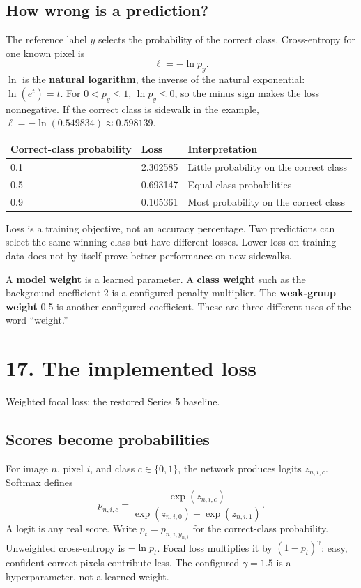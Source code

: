 \documentclass[11pt,letterpaper]{article}
\newcommand{\note}[1]{\par\vspace{3pt}\begingroup\setlength{\fboxsep}{8pt}%
 \colorbox{pale}{\parbox{\dimexpr\linewidth-2\fboxsep\relax}{#1}}\endgroup\par\vspace{3pt}}
\newcommand{\guidepage}[2]{\clearpage\pdfbookmark[0]{#1}{guide-\thepage}\section*{#1}{\sffamily\color{muted}#2}\par\vspace{5pt}}
\begin{document}
\subsection*{How wrong is a prediction?}
The reference label $y$ selects the probability of the correct class. Cross-entropy for one known pixel is
\[
\ell=-\ln p_y.
\]
$\ln$ is the \textbf{natural logarithm}, the inverse of the natural exponential: $\ln(e^t)=t$. For $0<p_y\le1$, $\ln p_y\le0$, so the minus sign makes the loss nonnegative. If the correct class is sidewalk in the example, $\ell=-\ln(0.549834)\approx0.598139$.

\begin{tabularx}{\linewidth}{@{}YYY@{}}\toprule
\textbf{Correct-class probability} & \textbf{Loss} & \textbf{Interpretation}\\ & 2.302585 & Little probability on the correct class\\
0.5 & 0.693147 & Equal class probabilities\\
0.9 & 0.105361 & Most probability on the correct class\\\bottomrule
\end{tabularx}

Loss is a training objective, not an accuracy percentage. Two predictions can select the same winning class but have different losses. Lower loss on training data does not by itself prove better performance on new sidewalks.

\note{A \textbf{model weight} is a learned parameter. A \textbf{class weight} such as the background coefficient 2 is a configured penalty multiplier. The \textbf{weak-group weight} 0.5 is another configured coefficient. These are three different uses of the word ``weight.''}

\guidepage{17. The implemented loss}{Weighted focal loss: the restored Series 5 baseline.}
\subsection*{Scores become probabilities}
For image $n$, pixel $i$, and class $c\in\{0,1\}$, the network produces logits $z_{n,i,c}$. Softmax defines
\[
p_{n,i,c}=\frac{\exp(z_{n,i,c})}{\exp(z_{n,i,0})+\exp(z_{n,i,1})}.
\]
A logit is any real score. Write $p_t=p_{n,i,y_{n,i}}$ for the correct-class probability. Unweighted cross-entropy is $-\ln p_t$. Focal loss multiplies it by $(1-p_t)^\gamma$: easy, confident correct pixels contribute less. The configured $\gamma=1.5$ is a hyperparameter, not a learned weight.
\end{document}

